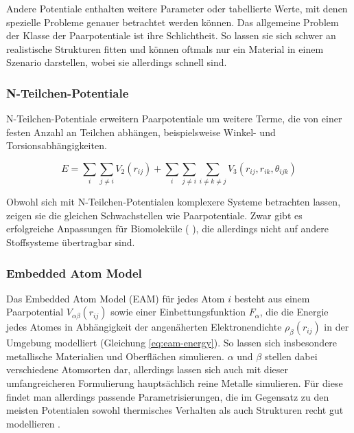 Andere Potentiale enthalten weitere Parameter oder tabellierte Werte, mit denen spezielle Probleme genauer betrachtet werden können.
Das allgemeine Problem der Klasse der Paarpotentiale ist ihre Schlichtheit.
So lassen sie sich schwer an realistische Strukturen fitten und können oftmals nur ein Material in einem Szenario darstellen, wobei sie allerdings schnell sind.

\subsubsection{N-Teilchen-Potentiale}

N-Teilchen-Potentiale  erweitern Paarpotentiale um weitere Terme, die von einer festen Anzahl an Teilchen abhängen, beispielsweise Winkel- und Torsionsabhängigkeiten.

\begin{equation}
  \label{eq:nbody-energy}
  E = \sum_i\sum_{j \neq i}{V_2\left(r_{ij}\right)} + \sum_i\sum_{j \neq i}\sum_{i \neq k \neq j}{V_3\left(r_{ij}, r_{ik}, \theta_{ijk}\right)}
\end{equation}

Obwohl sich mit N-Teilchen-Potentialen komplexere Systeme betrachten lassen, zeigen sie die gleichen Schwachstellen wie Paarpotentiale.
Zwar gibt es erfolgreiche  Anpassungen für Biomoleküle (  ), die allerdings nicht auf andere Stoffsysteme übertragbar sind.

\subsubsection{Embedded Atom Model}

Das Embedded Atom Model (EAM) für jedes Atom $i$ besteht aus einem Paarpotential $V_{\alpha\beta}(r_{ij})$ sowie einer Einbettungsfunktion $F_\alpha$, die die Energie jedes Atomes in Abhängigkeit der angenäherten Elektronendichte $\rho_\beta(r_{ij})$ in der Umgebung modelliert (Gleichung \ref{eq:eam-energy}).
So lassen sich insbesondere metallische Materialien und Oberflächen simulieren.
$\alpha$ und $\beta$ stellen dabei verschiedene Atomsorten dar, allerdings lassen sich auch mit dieser umfangreicheren Formulierung hauptsächlich reine Metalle simulieren.
Für diese findet man allerdings passende Parametrisierungen, die im Gegensatz zu den meisten Potentialen sowohl thermisches Verhalten als auch Strukturen recht gut modellieren .

